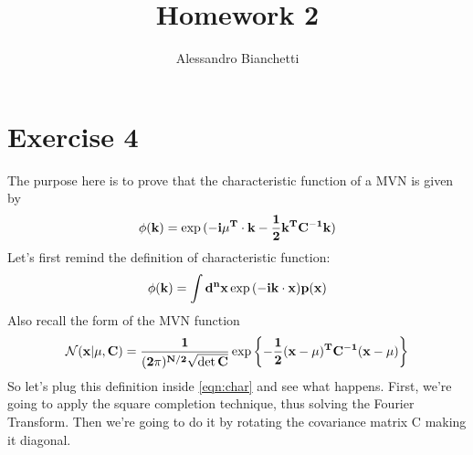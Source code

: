 \documentclass[a4paper,11pt,fleqn]{article}
\title{Homework 2}
\author{Alessandro Bianchetti}
\begin{document}
\maketitle

\section{Exercise 4}
The purpose here is to prove that the characteristic function of a MVN is given by
\begin{equation}
    \phi(\bf{k}) = \exp{(-i\mu^T\cdot \bf{k}-\frac{1}{2}\bf{k}^T C^{-1}\bf{k})}
\end{equation}
Let's first remind the definition of characteristic function:
\begin{equation}
    \label{eqn:char}
    \phi(\bf{k}) = \int d^nx \exp{(-i\bf{k}\cdot \bf{x} )p(\bf{x})}
\end{equation}
Also recall the form of the MVN function
\begin{equation}
    \mathcal{N}(\bf{x}|\bf{\mu}, C) = \frac{1}{(2\pi)^{N/2}\sqrt{\det{C}}} \exp{\left\{-\frac{1}{2}(\bf{x}-\bf{\mu})^T C^{-1} (\bf{x}-\bf{\mu})\right\}}
\end{equation}
So let's plug this definition inside \ref*{eqn:char} and see what happens. First,
we're going to apply the square completion technique, thus solving the Fourier Transform.
Then we're going to do it by rotating the covariance matrix C making it diagonal.
\end{document}
